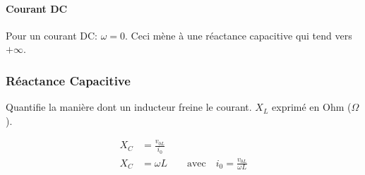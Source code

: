 \begin{multicols*}{2}
    \paragraph{Courant DC}
    Pour un courant DC: $\omega = 0$. Ceci mène à une réactance capacitive qui tend vers $+\infty$.
    
    \subsubsection{Réactance Capacitive}
    Quantifie la manière dont un inducteur freine le courant. $X_L$ exprimé en Ohm ($\Omega$).
    
    \begin{align*}
        X_C &= \frac{v_{0L}}{i_0} \\
        X_C &= \omega L \qquad \text{avec} \quad i_0 = \frac{v_{0L}}{\omega L}
    \end{align*}
    
    \begin{center}
    \end{center}
    
\end{multicols*}